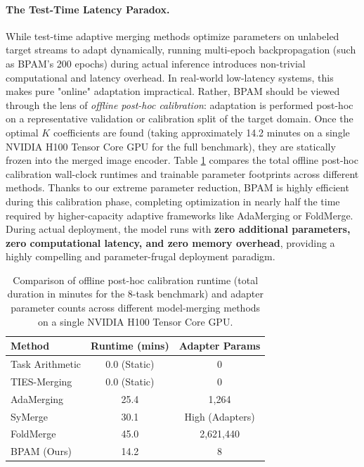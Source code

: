 \paragraph{The Test-Time Latency Paradox.} While test-time adaptive merging methods optimize parameters on unlabeled target streams to adapt dynamically, running multi-epoch backpropagation (such as BPAM's 200 epochs) during actual inference introduces non-trivial computational and latency overhead. In real-world low-latency systems, this makes pure "online" adaptation impractical. Rather, BPAM should be viewed through the lens of {\it offline post-hoc calibration}: adaptation is performed post-hoc on a representative validation or calibration split of the target domain. Once the optimal $K$ coefficients are found (taking approximately 14.2 minutes on a single NVIDIA H100 Tensor Core GPU for the full benchmark), they are statically frozen into the merged image encoder. Table \ref{tab:latency_results} compares the total offline post-hoc calibration wall-clock runtimes and trainable parameter footprints across different methods. Thanks to our extreme parameter reduction, BPAM is highly efficient during this calibration phase, completing optimization in nearly half the time required by higher-capacity adaptive frameworks like AdaMerging or FoldMerge. During actual deployment, the model runs with {\bf zero additional parameters, zero computational latency, and zero memory overhead}, providing a highly compelling and parameter-frugal deployment paradigm.

\begin{table}[h]
\caption{Comparison of offline post-hoc calibration runtime (total duration in minutes for the 8-task benchmark) and adapter parameter counts across different model-merging methods on a single NVIDIA H100 Tensor Core GPU.}
\label{tab:latency_results}
\vskip 0.15in
\begin{center}
\begin{small}
\begin{sc}
\setlength{\tabcolsep}{4pt}
\begin{tabular}{lcc}
\toprule
Method & Runtime (mins) & Adapter Params \\
\midrule
Task Arithmetic & 0.0 (Static) & 0 \\
TIES-Merging & 0.0 (Static) & 0 \\
AdaMerging & 25.4 & 1,264 \\
SyMerge & 30.1 & High (Adapters) \\
FoldMerge & 45.0 & 2,621,440 \\
BPAM (Ours) & 14.2 & 8 \\
\bottomrule
\end{tabular}
\end{sc}
\end{small}
\end{center}
\vskip -0.1in
\end{table}


